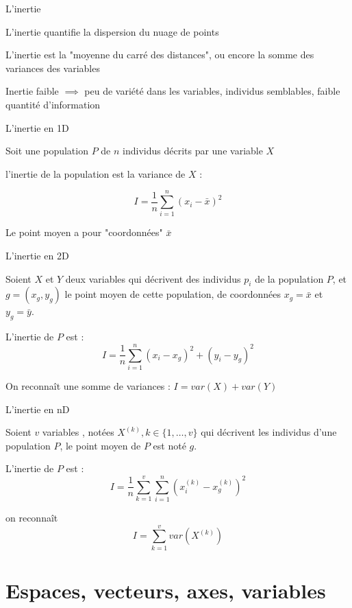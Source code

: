 \documentclass{beamer}
\begin{document}
\begin{frame}{L'inertie}

L'inertie quantifie la \alert{dispersion} du nuage de points

L'inertie est la "moyenne du carré des distances", ou encore la \alert{somme des variances} des variables

Inertie faible $\implies$ peu de variété dans les variables, individus semblables, faible quantité d'information
\end{frame}


\begin{frame}{L'inertie en 1D}


Soit une population $P$ de $n$ individus décrits par une variable $X$

l'inertie de la population est la \alert{variance} de $X$ : 

$$I= \frac{1}{n}\sum_{i=1}^n (x_i-\bar{x})^2$$

Le point moyen a pour "coordonnées" $\bar{x}$

\end{frame}


\begin{frame}{L'inertie en 2D}


Soient $X$ et $Y$ deux variables qui décrivent des individus $p_i$ de la population $P$, et $g=(x_g,y_g)$ le point moyen de cette population, de coordonnées $x_g=\bar{x}$ et $y_g=\bar{y}$.


L'inertie de $P$ est :  $$I= \frac{1}{n}\sum_{i=1}^n (x_i-x_g)^2 + (y_i-y_g)^2$$

On reconnaît une somme de variances : $I=var(X)+var(Y)$

\end{frame}


\begin{frame}{L'inertie en nD}

Soient  $v$ variables , notées $X^{(k)}, k \in \{1,\dots,v\}$ qui décrivent les individus d'une population $P$, le point moyen de $P$ est noté $g$.

L'inertie de $P$ est :  $$I= \frac{1}{n}\sum_{k=1}^v\sum_{i=1}^n (x_i^{(k)}-x^{(k)}_g)^2$$

on reconnaît $$I= \sum_{k=1}^v var(X^{(k)})$$

\end{frame}



\section{Espaces, vecteurs, axes, variables}
\end{document}

